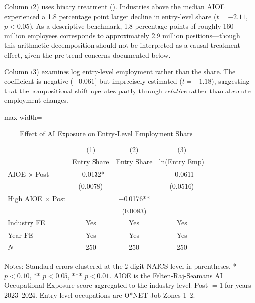 \documentclass[12pt]{article}
\begin{document}
Column (2) uses binary treatment (). Industries above the median AIOE experienced a 1.8 percentage point larger decline in entry-level share ($t = -2.11$, $p < 0.05$). As a descriptive benchmark, 1.8 percentage points of roughly 160 million employees corresponds to approximately 2.9 million positions---though this arithmetic decomposition should not be interpreted as a causal treatment effect, given the pre-trend concerns documented below.

Column (3) examines log entry-level employment rather than the share. The coefficient is negative ($-0.061$) but imprecisely estimated ($t = -1.18$), suggesting that the compositional shift operates partly through \emph{relative} rather than absolute employment changes.

\begin{table}[H]
\centering
\caption{Effect of AI Exposure on Entry-Level Employment Share}
\label{tab:main}
\begin{threeparttable}
\begin{adjustbox}{max width=\textwidth}
\begin{tabular}{lccc}
\toprule
 & (1) & (2) & (3) \\
 & Entry Share & Entry Share & ln(Entry Emp) \\
\midrule
AIOE $\times$ Post & $-$0.0132* & & $-$0.0611 \\
 & (0.0078) & & (0.0516) \\
High AIOE $\times$ Post & & $-$0.0176** & \\
 & & (0.0083) & \\
\midrule
Industry FE & Yes & Yes & Yes \\
Year FE & Yes & Yes & Yes \\
$N$ & 250 & 250 & 250 \\
\bottomrule
\end{tabular}
\end{adjustbox}
\begin{tablenotes}[flushleft]
\small
\item Notes: Standard errors clustered at the 2-digit NAICS level in parentheses. * $p<0.10$, ** $p<0.05$, *** $p<0.01$. AIOE is the Felten-Raj-Seamans AI Occupational Exposure score aggregated to the industry level. Post $= 1$ for years 2023--2024. Entry-level occupations are O*NET Job Zones 1--2.
\end{tablenotes}
\end{threeparttable}
\end{table}
\end{document}
